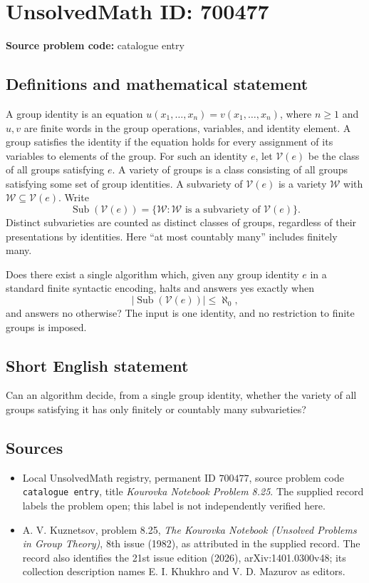 \documentclass[11pt]{article}
\begin{document}
\section*{UnsolvedMath ID: 700477}
\textbf{Source problem code:} catalogue entry
\subsection{Definitions and mathematical statement}
A group identity is an equation \(u(x_1,\ldots,x_n)=v(x_1,\ldots,x_n)\), where \(n\geq 1\) and \(u,v\) are finite words in the group operations, variables, and identity element. A group satisfies the identity if the equation holds for every assignment of its variables to elements of the group. For such an identity \(e\), let \(\mathcal V(e)\) be the class of all groups satisfying \(e\). A variety of groups is a class consisting of all groups satisfying some set of group identities. A subvariety of \(\mathcal V(e)\) is a variety \(\mathcal W\) with \(\mathcal W\subseteq\mathcal V(e)\). Write
\[
\operatorname{Sub}(\mathcal V(e))=\{\mathcal W:\mathcal W\text{ is a subvariety of }\mathcal V(e)\}.
\]
Distinct subvarieties are counted as distinct classes of groups, regardless of their presentations by identities. Here ``at most countably many'' includes finitely many.

Does there exist a single algorithm which, given any group identity \(e\) in a standard finite syntactic encoding, halts and answers yes exactly when
\[
\bigl|\operatorname{Sub}(\mathcal V(e))\bigr|\leq\aleph_0,
\]
and answers no otherwise? The input is one identity, and no restriction to finite groups is imposed.
\subsection{Short English statement}
Can an algorithm decide, from a single group identity, whether the variety of all groups satisfying it has only finitely or countably many subvarieties?
\subsection{Sources}
\begin{itemize}
\item Local UnsolvedMath registry, permanent ID \(700477\), source problem code \texttt{catalogue entry}, title \emph{Kourovka Notebook Problem 8.25}. The supplied record labels the problem open; this label is not independently verified here.
\item A. V. Kuznetsov, problem 8.25, \emph{The Kourovka Notebook (Unsolved Problems in Group Theory)}, 8th issue (1982), as attributed in the supplied record. The record also identifies the 21st issue edition (2026), arXiv:1401.0300v48; its collection description names E. I. Khukhro and V. D. Mazurov as editors.
\end{itemize}
\end{document}
